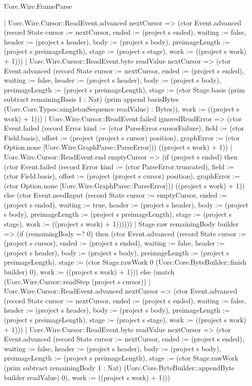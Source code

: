 \begin{lexlean}{Uorc.Wire.FrameParse}
\begin{semanticmodule}
{      | Uorc.Wire.Cursor::ReadEvent.advanced nextCursor => (ctor Event.advanced (record State {cursor := nextCursor, ended := (project s ended), waiting := false, header := (project s header), body := (project s body), preimageLength := (project s preimageLength), stage := (project s stage), work := ((project s work) + 1)}))
      | Uorc.Wire.Cursor::ReadEvent.byte readValue nextCursor => (ctor Event.advanced (record State {cursor := nextCursor, ended := (project s ended), waiting := false, header := (project s header), body := (project s body), preimageLength := (project s preimageLength), stage := (ctor Stage.basis (prim subtract remainingBasis 1 : Nat) (prim append basisBytes (Uorc.Core.Types::singletonSequence readValue) : Bytes)), work := ((project s work) + 1)}))
      | Uorc.Wire.Cursor::ReadEvent.failed ignoredReadError => (ctor Event.failed (record Error {kind := (ctor ParseError.cursorFailure), field := (ctor Field.basis), offset := (project (project s cursor) position), graphError := (ctor Option.none [Uorc.Wire.GraphParse::ParseError])}) ((project s work) + 1))
      | Uorc.Wire.Cursor::ReadEvent.end emptyCursor => (if (project s ended) then (ctor Event.failed (record Error {kind := (ctor ParseError.truncated), field := (ctor Field.basis), offset := (project (project s cursor) position), graphError := (ctor Option.none [Uorc.Wire.GraphParse::ParseError])}) ((project s work) + 1)) else (ctor Event.needInput (record State {cursor := emptyCursor, ended := (project s ended), waiting := true, header := (project s header), body := (project s body), preimageLength := (project s preimageLength), stage := (project s stage), work := ((project s work) + 1)})))))
    | Stage.raw remainingBody builder => (if (remainingBody =? 0) then (ctor Event.advanced (record State {cursor := (project s cursor), ended := (project s ended), waiting := false, header := (project s header), body := (project s body), preimageLength := (project s preimageLength), stage := (ctor Stage.rawWork 0 (Uorc.Core.ByteBuilder::finish builder) 0), work := ((project s work) + 1)})) else (match (Uorc.Wire.Cursor::readStep (project s cursor))
      | Uorc.Wire.Cursor::ReadEvent.advanced nextCursor => (ctor Event.advanced (record State {cursor := nextCursor, ended := (project s ended), waiting := false, header := (project s header), body := (project s body), preimageLength := (project s preimageLength), stage := (project s stage), work := ((project s work) + 1)}))
      | Uorc.Wire.Cursor::ReadEvent.byte readValue nextCursor => (ctor Event.advanced (record State {cursor := nextCursor, ended := (project s ended), waiting := false, header := (project s header), body := (project s body), preimageLength := (project s preimageLength), stage := (ctor Stage.rawWork (prim subtract remainingBody 1 : Nat) (Uorc.Core.ByteBuilder::appendByte builder readValue) 0), work := ((project s work) + 1)}))
}
\end{semanticmodule}
\end{lexlean}
